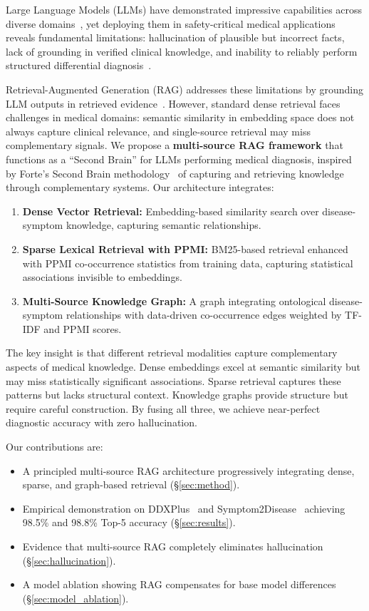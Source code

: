 \documentclass[preprint,12pt]{elsarticle}
\begin{document}
Large Language Models (LLMs) have demonstrated impressive capabilities across diverse domains~\cite{brown2020language,openai2023gpt4}, yet deploying them in safety-critical medical applications reveals fundamental limitations: hallucination of plausible but incorrect facts, lack of grounding in verified clinical knowledge, and inability to reliably perform structured differential diagnosis~\cite{ji2023survey,singhal2023large}.

Retrieval-Augmented Generation (RAG) addresses these limitations by grounding LLM outputs in retrieved evidence~\cite{lewis2020retrieval,gao2023retrieval}. However, standard dense retrieval faces challenges in medical domains: semantic similarity in embedding space does not always capture clinical relevance, and single-source retrieval may miss complementary signals. We propose a \textbf{multi-source RAG framework} that functions as a ``Second Brain'' for LLMs performing medical diagnosis, inspired by Forte's Second Brain methodology~\cite{forte2022building} of capturing and retrieving knowledge through complementary systems. Our architecture integrates:

\begin{enumerate}
    \item \textbf{Dense Vector Retrieval:} Embedding-based similarity search over disease-symptom knowledge, capturing semantic relationships.
    \item \textbf{Sparse Lexical Retrieval with PPMI:} BM25-based retrieval enhanced with PPMI co-occurrence statistics from training data, capturing statistical associations invisible to embeddings.
    \item \textbf{Multi-Source Knowledge Graph:} A graph integrating ontological disease-symptom relationships with data-driven co-occurrence edges weighted by TF-IDF and PPMI scores.
\end{enumerate}

The key insight is that different retrieval modalities capture complementary aspects of medical knowledge. Dense embeddings excel at semantic similarity but may miss statistically significant associations. Sparse retrieval captures these patterns but lacks structural context. Knowledge graphs provide structure but require careful construction. By fusing all three, we achieve near-perfect diagnostic accuracy with zero hallucination.

Our contributions are:
\begin{itemize}
    \item A principled multi-source RAG architecture progressively integrating dense, sparse, and graph-based retrieval (\S\ref{sec:method}).
    \item Empirical demonstration on DDXPlus~\cite{fansi2022ddxplus} and Symptom2Disease~\cite{gretelai_s2d} achieving 98.5\% and 98.8\% Top-5 accuracy (\S\ref{sec:results}).
    \item Evidence that multi-source RAG completely eliminates hallucination (\S\ref{sec:hallucination}).
    \item A model ablation showing RAG compensates for base model differences (\S\ref{sec:model_ablation}).
\end{itemize}
\end{document}
